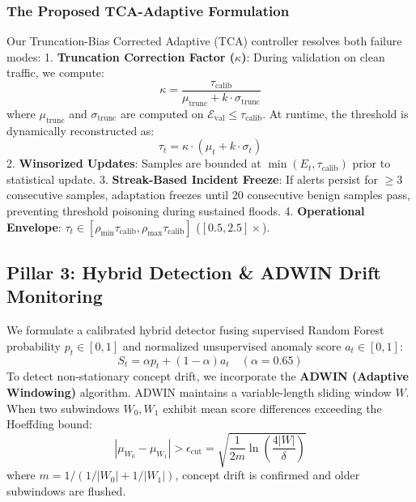 \documentclass{ieeeaccess}
\begin{document}
\subsubsection{The Proposed TCA-Adaptive Formulation}
Our Truncation-Bias Corrected Adaptive (TCA) controller resolves both failure modes:
1. \textbf{Truncation Correction Factor ($\kappa$)}:
During validation on clean traffic, we compute:
\begin{equation}
    \kappa = \frac{\tau_{\text{calib}}}{\mu_{\text{trunc}} + k \cdot \sigma_{\text{trunc}}}
\end{equation}
where $\mu_{\text{trunc}}$ and $\sigma_{\text{trunc}}$ are computed on $\mathcal{E}_{\text{val}} \le \tau_{\text{calib}}$. At runtime, the threshold is dynamically reconstructed as:
\begin{equation}
    \tau_t = \kappa \cdot (\mu_t + k \cdot \sigma_t)
\end{equation}
2. \textbf{Winsorized Updates}: Samples are bounded at $\min(E_t, \tau_{\text{calib}})$ prior to statistical update.
3. \textbf{Streak-Based Incident Freeze}: If alerts persist for $\ge 3$ consecutive samples, adaptation freezes until 20 consecutive benign samples pass, preventing threshold poisoning during sustained floods.
4. \textbf{Operational Envelope}: $\tau_t \in [\rho_{\min}\tau_{\text{calib}}, \rho_{\max}\tau_{\text{calib}}]$ ($[0.5, 2.5]\times$).

\subsection{Pillar 3: Hybrid Detection & ADWIN Drift Monitoring}
We formulate a calibrated hybrid detector fusing supervised Random Forest probability $p_t \in [0, 1]$ and normalized unsupervised anomaly score $a_t \in [0, 1]$:
\begin{equation}
    S_t = \alpha p_t + (1 - \alpha) a_t \quad (\alpha = 0.65)
\end{equation}
To detect non-stationary concept drift, we incorporate the \textbf{ADWIN (Adaptive Windowing)} algorithm. ADWIN maintains a variable-length sliding window $W$. When two subwindows $W_0, W_1$ exhibit mean score differences exceeding the Hoeffding bound:
\begin{equation}
    |\mu_{W_0} - \mu_{W_1}| > \epsilon_{\text{cut}} = \sqrt{\frac{1}{2m} \ln\left(\frac{4|W|}{\delta}\right)}
\end{equation}
where $m = 1/(1/|W_0| + 1/|W_1|)$, concept drift is confirmed and older subwindows are flushed.
\end{document}
